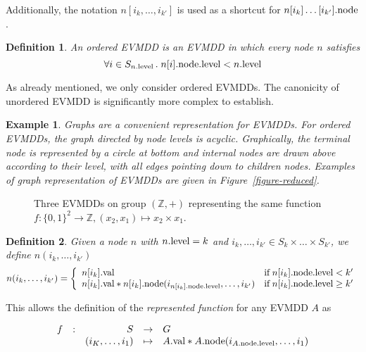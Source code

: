 \documentclass[nocover]             %
{NASA}                       %
\newcommand{\Z}{\mathbb{Z}}
\newcommand{\m}{\mbox}
\newtheorem{mydefinition}{Definition}[section]
\newtheorem{myexample}{Example}[section]
\newcommand{\val}[1]{#1{\rm .val}}
\newcommand{\node}[1]{#1{\rm .node}}
\newcommand{\level}[1]{#1{\rm .level}}
\begin{document}
Additionally, the notation $n[i_k, \ldots, i_{k'}]$ is used as a shortcut for
$\node{n[i_k]\ldots[i_{k'}]}$.

\begin{mydefinition}
An \emph{ordered} EVMDD is an EVMDD in which every node $n$ satisfies
$$
\forall i \in S_{\level{n}}\,.\; \level{\node{n[i]}} < \level{n}
$$
\end{mydefinition}

As already mentioned, we only consider ordered EVMDDs.
The canonicity of unordered EVMDD is significantly more complex to establish.

\begin{myexample}
Graphs are a convenient representation for EVMDDs.
For ordered EVMDDs, the graph directed by node levels is acyclic.
Graphically, the terminal node is represented
by a circle at bottom and internal nodes are drawn above according
to their level, with all edges pointing down to children nodes.
Examples of graph representation of EVMDDs are given in Figure~\vref{figure-reduced}.
\end{myexample}

\begin{figure}[htbp]
  \centering
    
  \caption{Three EVMDDs on group $(\Z, +)$ representing the same function $f:\{0, 1\}^2\rightarrow\Z, (x_2, x_1)\mapsto x_2\times x_1$.}
\label{figure-reduced}
\end{figure}

\begin{mydefinition}
Given a node $n$ with $\level{n} = k$ and $i_k,\ldots, i_{k'} \in S_k \times \ldots \times S_{k'}$, we define $n(i_k, \ldots, i_{k'})$
$$
n(i_k,\ldots, i_{k'}) = \left\{
  \begin{array}{ll}
    \val{n[i_k]}&\m{if}\;\level{\node{n[i_k]}} < k'\\
    \val{n[i_k]} * \node{n[i_k]}(i_{\level{\node{n[i_k]}}},\ldots, i_{k'})&\m{if}\;\level{\node{n[i_k]}} \geq k'
  \end{array}
\right.
$$
\end{mydefinition}

This allows the definition of the \emph{represented function} for any EVMDD $A$ as

$$
\begin{array}{lcrcl}
  f&:&S&\rightarrow&G\\
   & &(i_K,\ldots, i_1)&\mapsto&\val{A} * \node{A}(i_{\level{\node{A}}},\ldots, i_1)
\end{array}
$$
\end{document}

